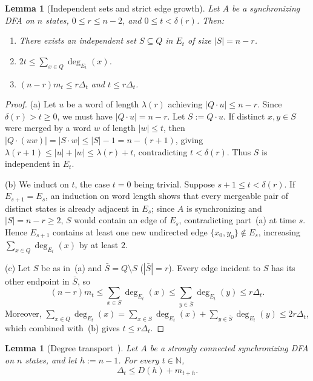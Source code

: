 \documentclass[11pt]{article}
\newtheorem{lemma}[theorem]{Lemma}
\theoremstyle{definition}
\theoremstyle{remark}
\newcommand{\N}{\mathbb{N}}
\begin{document}
\begin{lemma}[Independent sets and strict edge growth]\label{lem:merge-basic}
Let $A$ be a synchronizing DFA on $n$ states, $0 \le r \le n - 2$, and $0 \le t < \delta(r)$. Then:
\begin{enumerate}[label=(\alph*), leftmargin=2em]
  \item There exists an independent set $S \subseteq Q$ in $E_t$ of size $|S| = n - r$.
  \item $2t \le \sum_{x \in Q} \deg_{E_t}(x)$.
  \item $(n - r) m_t \le r \Delta_t$ and $t \le r \Delta_t$.
\end{enumerate}
\end{lemma}

\begin{proof}
(a) Let $u$ be a word of length $\lambda(r)$ achieving $|Q \cdot u| \le n - r$. Since $\delta(r) > t \ge 0$, we must have $|Q \cdot u| = n - r$. Let $S := Q \cdot u$. If distinct $x, y \in S$ were merged by a word $w$ of length $|w| \le t$, then $|Q \cdot (uw)| = |S \cdot w| \le |S| - 1 = n - (r + 1)$, giving $\lambda(r + 1) \le |u| + |w| \le \lambda(r) + t$, contradicting $t < \delta(r)$. Thus $S$ is independent in $E_t$.

(b) We induct on $t$, the case $t = 0$ being trivial. Suppose $s + 1 \le t < \delta(r)$. If $E_{s+1} = E_s$, an induction on word length shows that every mergeable pair of distinct states is already adjacent in $E_s$; since $A$ is synchronizing and $|S| = n - r \ge 2$, $S$ would contain an edge of $E_s$, contradicting part~(a) at time $s$. Hence $E_{s+1}$ contains at least one new undirected edge $\{x_0, y_0\} \notin E_s$, increasing $\sum_{x \in Q} \deg_{E_t}(x)$ by at least $2$.

(c) Let $S$ be as in~(a) and $\bar{S} = Q \setminus S$ ($|\bar{S}| = r$). Every edge incident to $S$ has its other endpoint in $\bar{S}$, so
\[
  (n - r) m_t \le \sum_{x \in S} \deg_{E_t}(x) \le \sum_{y \in \bar{S}} \deg_{E_t}(y) \le r \Delta_t.
\]
Moreover, $\sum_{x \in Q} \deg_{E_t}(x) = \sum_{x \in S} \deg_{E_t}(x) + \sum_{y \in \bar{S}} \deg_{E_t}(y) \le 2 r \Delta_t$, which combined with~(b) gives $t \le r \Delta_t$.
\end{proof}

\begin{lemma}[Degree transport~\cite{Hong2026a}]\label{lem:deg-transport}
Let $A$ be a strongly connected synchronizing DFA on $n$ states, and let $h := n - 1$. For every $t \in \N$,
\[
  \Delta_t \le D(h) + m_{t + h}.
\]
\end{lemma}
\end{document}
